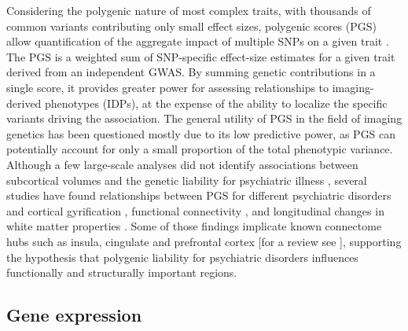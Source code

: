 Considering the polygenic nature of most complex traits, with thousands of common variants contributing only small effect sizes, polygenic scores (PGS) allow quantification of the aggregate impact of multiple SNPs on a given trait \citep{Dudbridge2013}. The PGS is a weighted sum of SNP-specific effect-size estimates for a given trait derived from an independent GWAS. By summing genetic contributions in a single score, it provides greater power for assessing relationships to imaging-derived phenotypes (IDPs), at the expense of the ability to localize the specific variants driving the association. The general utility of PGS in the field of imaging genetics has been questioned \citep{Papiol2014} mostly due to its low predictive power, as PGS can potentially account for only a small proportion of the total phenotypic variance. Although a few large-scale analyses did not identify associations between subcortical volumes and the genetic liability for psychiatric illness \citep{Franke2016,Reus2017}, several studies have found relationships between PGS for different psychiatric disorders and cortical gyrification \citep{Liu2016a}, functional connectivity \citep{Dezhina2018,Wang2017}, and longitudinal changes in white matter properties \citep{Alloza2018}. Some of those findings implicate known connectome hubs such as insula, cingulate and prefrontal cortex [for a review see \citet{Dezhina2018}], supporting the hypothesis that polygenic liability for psychiatric disorders influences functionally and structurally important regions.

\subsection{Gene expression}

